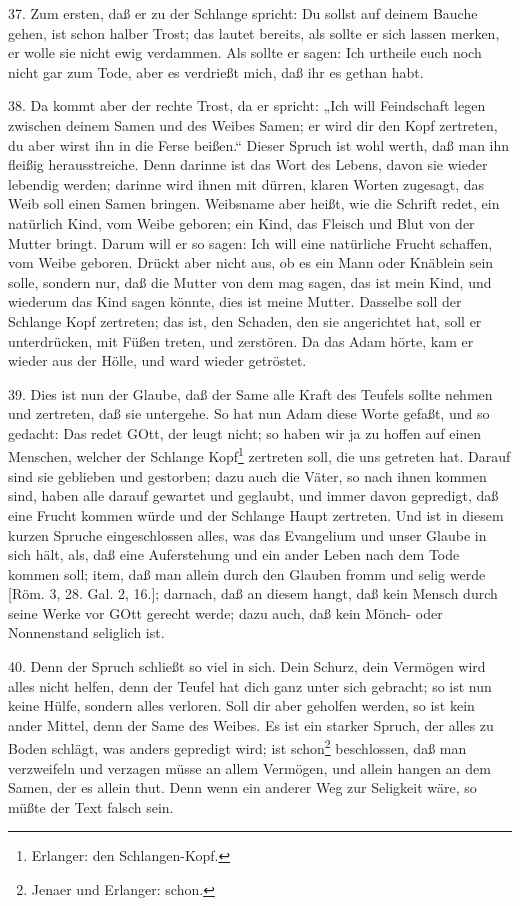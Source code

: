 37. Zum ersten, daß er zu der Schlange spricht: Du sollst auf deinem Bauche gehen, ist schon halber Trost; das lautet bereits, als sollte er sich lassen merken, er wolle sie nicht ewig verdammen. Als sollte er sagen: Ich urtheile euch noch
nicht gar zum Tode, aber es verdrießt mich, daß ihr es gethan habt.

38. Da kommt aber der rechte Trost, da er spricht: „Ich will Feindschaft legen zwischen deinem Samen und des Weibes Samen; er wird dir den Kopf zertreten, du aber wirst ihn in die Ferse beißen.“ Dieser Spruch ist wohl werth, daß man ihn fleißig herausstreiche. Denn darinne ist das Wort des Lebens, davon sie wieder lebendig werden; darinne wird ihnen mit dürren, klaren Worten zugesagt, das Weib soll einen Samen bringen. Weibsname aber heißt, wie die Schrift redet, ein natürlich Kind, vom Weibe geboren; ein Kind, das Fleisch und Blut von der Mutter bringt. Darum will er so sagen: Ich will eine natürliche Frucht schaffen, vom Weibe geboren. Drückt aber nicht aus, ob es ein Mann oder Knäblein sein solle, sondern nur, daß die Mutter von dem mag sagen, das ist mein Kind, und wiederum das Kind sagen könnte, dies ist meine Mutter. Dasselbe soll der Schlange Kopf zertreten; das ist, den Schaden, den sie angerichtet hat, soll er unterdrücken, mit Füßen treten, und zerstören. Da das Adam hörte, kam er wieder aus der Hölle, und ward wieder getröstet.

39. Dies ist nun der Glaube, daß der Same alle Kraft des Teufels sollte nehmen und zertreten, daß sie untergehe. So hat nun Adam diese Worte gefaßt, und so gedacht: Das redet GOtt, der leugt nicht; so haben wir ja zu hoffen auf einen Menschen, welcher der Schlange Kopf\footnote{Erlanger: den Schlangen-Kopf.} zertreten soll, die uns getreten hat. Darauf sind sie geblieben und gestorben; dazu auch die Väter, so nach ihnen kommen sind, haben alle darauf gewartet und geglaubt, und immer davon gepredigt, daß eine Frucht kommen würde und der Schlange Haupt zertreten. Und ist in diesem kurzen Spruche eingeschlossen alles, was das Evangelium und unser Glaube in sich hält, als, daß eine Auferstehung und ein ander Leben nach dem Tode kommen soll; item, daß man allein durch den Glauben fromm und selig werde [Röm. 3, 28. Gal. 2, 16.]; darnach, daß an diesem hangt, daß kein Mensch durch seine Werke vor GOtt gerecht werde; dazu auch, daß kein Mönch- oder Nonnenstand seliglich ist.

40. Denn der Spruch schließt so viel in sich. Dein Schurz, dein Vermögen wird alles nicht helfen, denn der Teufel hat dich ganz unter sich gebracht; so ist nun keine Hülfe, sondern alles verloren. Soll dir aber geholfen werden, so ist kein ander Mittel, denn der Same des Weibes. Es ist ein starker Spruch, der alles zu Boden schlägt, was anders gepredigt wird; ist schon\footnote{Jenaer und Erlanger: schon.} beschlossen, daß man verzweifeln und verzagen müsse an allem Vermögen, und allein hangen an dem Samen, der es allein thut. Denn wenn ein anderer Weg zur Seligkeit wäre, so müßte der Text falsch sein.

